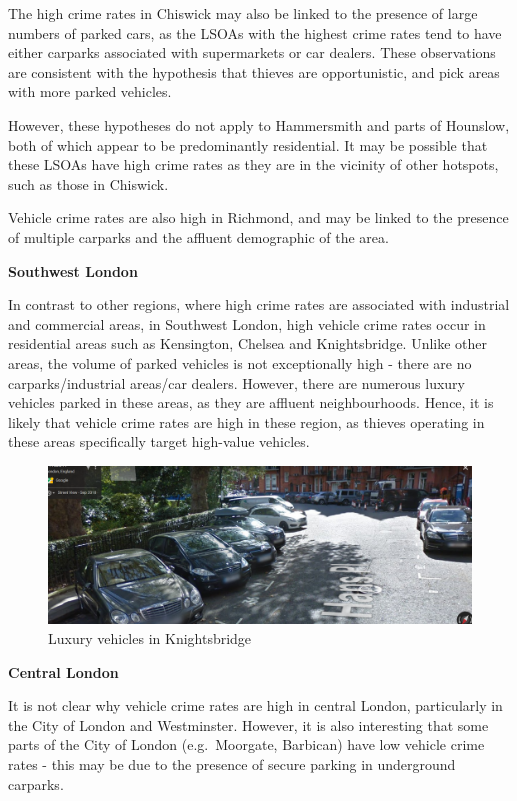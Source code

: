 \documentclass[]{article}
\theoremstyle{definition}
\theoremstyle{definition}
\theoremstyle{definition}
\theoremstyle{remark}
\begin{document}
The high crime rates in Chiswick may also be linked to the presence of
large numbers of parked cars, as the LSOAs with the highest crime rates
tend to have either carparks associated with supermarkets or car
dealers. These observations are consistent with the hypothesis that
thieves are opportunistic, and pick areas with more parked vehicles.

However, these hypotheses do not apply to Hammersmith and parts of
Hounslow, both of which appear to be predominantly residential. It may
be possible that these LSOAs have high crime rates as they are in the
vicinity of other hotspots, such as those in Chiswick.

Vehicle crime rates are also high in Richmond, and may be linked to the
presence of multiple carparks and the affluent demographic of the area.

\textbf{Southwest London}

In contrast to other regions, where high crime rates are associated with
industrial and commercial areas, in Southwest London, high vehicle crime
rates occur in residential areas such as Kensington, Chelsea and
Knightsbridge. Unlike other areas, the volume of parked vehicles is not
exceptionally high - there are no carparks/industrial areas/car dealers.
However, there are numerous luxury vehicles parked in these areas, as
they are affluent neighbourhoods. Hence, it is likely that vehicle crime
rates are high in these region, as thieves operating in these areas
specifically target high-value vehicles.

\begin{figure}
\centering
\includegraphics{pictures/Knightsbridge.png}
\caption{Luxury vehicles in Knightsbridge}
\end{figure}

\textbf{Central London}

It is not clear why vehicle crime rates are high in central London,
particularly in the City of London and Westminster. However, it is also
interesting that some parts of the City of London (e.g.~Moorgate,
Barbican) have low vehicle crime rates - this may be due to the presence
of secure parking in underground carparks.
\end{document}

